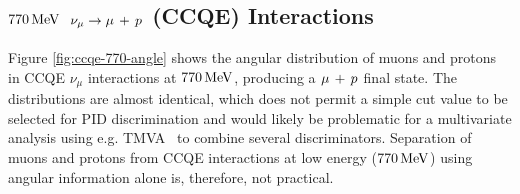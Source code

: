 \subsection{$770\,\mathrm{MeV}$ \texorpdfstring{$\nu_\mu \rightarrow \mu\,+\,p$}{ν\_μ → μ + p} (CCQE) Interactions}
Figure \ref{fig:ccqe-770-angle} shows the angular distribution of muons and protons in \acs{CCQE} $\nu_\mu$ interactions at $770\,\mathrm{MeV}$, producing a $\mu\,+\,p$ final state. The distributions are almost identical, which does not permit a simple cut value to be selected for PID discrimination and would likely be problematic for a multivariate analysis using e.g. TMVA~\citep{TMVA} to combine several discriminators. Separation of muons and protons from \acs{CCQE} interactions at low energy ($770\,\mathrm{MeV}$) using angular information alone is, therefore, not practical.

\begin{figure}
    \centering
\end{figure}
